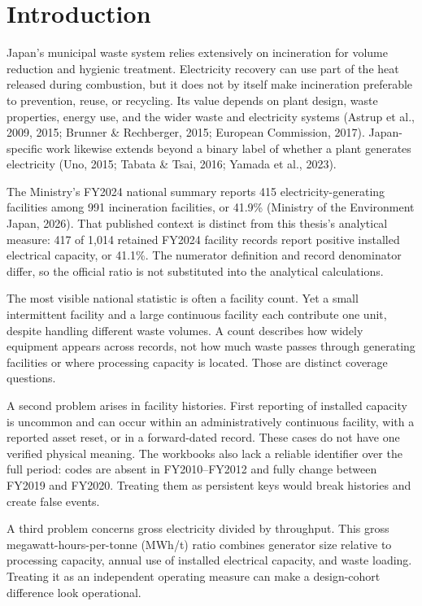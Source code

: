 \documentclass[12pt,letterpaper]{article}
\begin{document}
\section{Introduction}

Japan's municipal waste system relies extensively on incineration for volume
reduction and hygienic treatment. Electricity recovery can use part of the heat
released during combustion, but it does not by itself make incineration
preferable to prevention, reuse, or recycling. Its value depends on plant
design, waste properties, energy use, and the wider waste and electricity
systems (Astrup et al., 2009, 2015; Brunner \& Rechberger, 2015; European
Commission, 2017). Japan-specific work likewise extends beyond a binary label
of whether a plant generates electricity (Uno, 2015; Tabata \& Tsai, 2016;
Yamada et al., 2023).

The Ministry's FY2024 national summary reports 415 electricity-generating
facilities among 991 incineration facilities, or 41.9\% (Ministry of the
Environment Japan, 2026). That published context is distinct from this thesis's
analytical measure: 417 of 1,014 retained FY2024 facility records report
positive installed electrical capacity, or 41.1\%. The numerator definition and
record denominator differ, so the official ratio is not substituted into the
analytical calculations.

The most visible national statistic is often a facility count. Yet a small
intermittent facility and a large continuous facility each contribute one unit,
despite handling different waste volumes. A count describes how widely
equipment appears across records, not how much waste passes through generating
facilities or where processing capacity is located. Those are distinct coverage
questions.

A second problem arises in facility histories. First reporting of installed
capacity is uncommon and can occur within an administratively continuous
facility, with a reported asset reset, or in a forward-dated record. These cases
do not have one verified physical meaning. The workbooks also lack a reliable
identifier over the full period: codes are absent in FY2010--FY2012 and fully
change between FY2019 and FY2020. Treating them as persistent keys would break
histories and create false events.

A third problem concerns gross electricity divided by throughput. This gross
megawatt-hours-per-tonne (MWh/t) ratio combines generator size relative to
processing capacity, annual use of
installed electrical capacity, and waste loading. Treating it as an independent
operating measure can make a design-cohort difference look operational.
\end{document}
